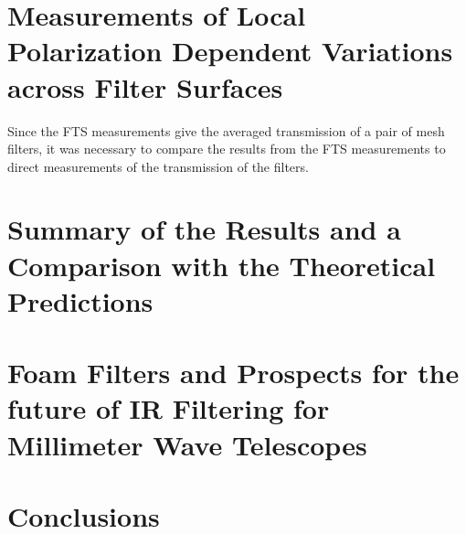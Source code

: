 \documentclass[12pt]{article}
\begin{document}
\section{Measurements of Local Polarization Dependent Variations across Filter Surfaces}
Since the FTS measurements give the averaged transmission of a pair of mesh filters, it was necessary to compare the results from the FTS measurements to direct measurements of the transmission of the filters.

\section{Summary of the Results and a Comparison with the Theoretical Predictions}

\section{Foam Filters and Prospects for the future of IR Filtering for Millimeter Wave Telescopes}

\section{Conclusions}
\end{document}
